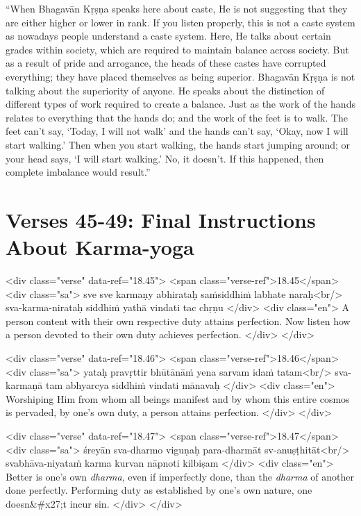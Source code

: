 \enquote{When Bhagavān Kṛṣṇa speaks here about caste, He is not suggesting that they are either higher or lower in rank. If you listen properly, this is not a caste system as nowadays people understand a caste system. Here, He talks about certain grades within society, which are required to maintain balance across society. But as a result of pride and arrogance, the heads of these castes have corrupted everything; they have placed themselves as being superior. Bhagavān Kṛṣṇa is not talking about the superiority of anyone. He speaks about the distinction of different types of work required to create a balance. Just as the work of the hands relates to everything that the hands do; and the work of the feet is to walk. The feet can’t say, \enquote{Today, I will not walk} and the hands can’t say, \enquote{Okay, now I will start walking.} Then when you start walking, the hands start jumping around; or your head says, \enquote{I will start walking.} No, it doesn’t. If this happened, then complete imbalance would result.}

\section{Verses 45-49: Final Instructions About Karma-yoga}\label{sec-verses-45-49-final-instructions-about-karma-yoga}

\begin{html}
<div class="verse" data-ref="18.45">
  <span class="verse-ref">18.45</span>
  <div class="sa">
    sve sve karmaṇy abhirataḥ saṁsiddhiṁ labhate naraḥ<br/>
    sva-karma-nirataḥ siddhiṁ yathā vindati tac chṛṇu
  </div>
  <div class="en">
    A person content with their own respective duty attains perfection. Now listen how a person devoted to their own duty achieves perfection.
  </div>
</div>
\end{html}



\begin{html}
<div class="verse" data-ref="18.46">
  <span class="verse-ref">18.46</span>
  <div class="sa">
    yataḥ pravṛttir bhūtānāṁ yena sarvam idaṁ tatam<br/>
    sva-karmaṇā tam abhyarcya siddhiṁ vindati mānavaḥ
  </div>
  <div class="en">
    Worshiping Him from whom all beings manifest and by whom this entire cosmos is pervaded, by one’s own duty, a person attains perfection.
  </div>
</div>
\end{html}



\begin{html}
<div class="verse" data-ref="18.47">
  <span class="verse-ref">18.47</span>
  <div class="sa">
    śreyān sva-dharmo viguṇaḥ para-dharmāt sv-anuṣṭhitāt<br/>
    svabhāva-niyataṁ karma kurvan nāpnoti kilbiṣam
  </div>
  <div class="en">
    Better is one’s own \textit{dharma}, even if imperfectly done, than the \textit{dharma} of another done perfectly. Performing duty as established by one’s own nature, one doesn&#x27;t incur sin.
  </div>
</div>
\end{html}



